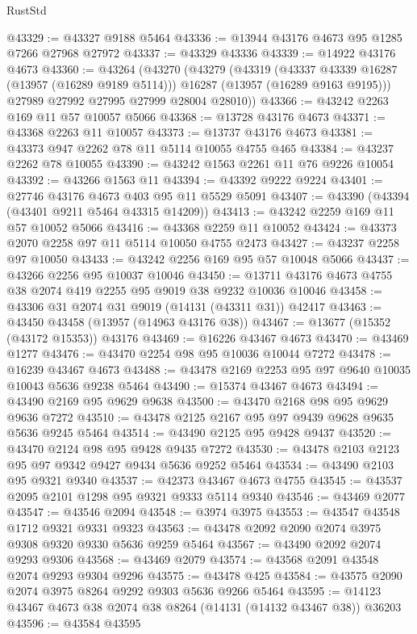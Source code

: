 \begin{lexlean}{RustStd}
\begin{coremodule}
@43329 := @43327 @9188 @5464
@43336 := @13944 @43176 @4673 @95 @1285 @7266 @27968 @27972
@43337 := @43329 @43336
@43339 := @14922 @43176 @4673
@43360 := @43264
    (@43270
      (@43279
        (@43319
          (@43337 @43339 @16287 (@13957 (@16289 @9189 @5114)))
          @16287
          (@13957 (@16289 @9163 @9195)))
        @27989
        @27992
        @27995
        @27999
        @28004
        @28010))
@43366 := @43242 @2263 @169 @11 @57 @10057 @5066
@43368 := @13728 @43176 @4673
@43371 := @43368 @2263 @11 @10057
@43373 := @13737 @43176 @4673
@43381 := @43373 @947 @2262 @78 @11 @5114 @10055 @4755 @465
@43384 := @43237 @2262 @78 @10055
@43390 := @43242 @1563 @2261 @11 @76 @9226 @10054
@43392 := @43266 @1563 @11
@43394 := @43392 @9222 @9224
@43401 := @27746 @43176 @4673 @403 @95 @11 @5529 @5091
@43407 := @43390 (@43394 (@43401 @9211 @5464 @43315 @14209))
@43413 := @43242 @2259 @169 @11 @57 @10052 @5066
@43416 := @43368 @2259 @11 @10052
@43424 := @43373 @2070 @2258 @97 @11 @5114 @10050 @4755 @2473
@43427 := @43237 @2258 @97 @10050
@43433 := @43242 @2256 @169 @95 @57 @10048 @5066
@43437 := @43266 @2256 @95 @10037 @10046
@43450 := @13711 @43176 @4673 @4755 @38 @2074 @419 @2255 @95 @9019 @38 @9232 @10036 @10046
@43458 := @43306 @31 @2074 @31 @9019 (@14131 (@43311 @31)) @42417
@43463 := @43450 @43458 (@13957 (@14963 @43176 @38))
@43467 := @13677 (@15352 (@43172 @15353)) @43176
@43469 := @16226 @43467 @4673
@43470 := @43469 @1277
@43476 := @43470 @2254 @98 @95 @10036 @10044 @7272
@43478 := @16239 @43467 @4673
@43488 := @43478 @2169 @2253 @95 @97 @9640 @10035 @10043 @5636 @9238 @5464
@43490 := @15374 @43467 @4673
@43494 := @43490 @2169 @95 @9629 @9638
@43500 := @43470 @2168 @98 @95 @9629 @9636 @7272
@43510 := @43478 @2125 @2167 @95 @97 @9439 @9628 @9635 @5636 @9245 @5464
@43514 := @43490 @2125 @95 @9428 @9437
@43520 := @43470 @2124 @98 @95 @9428 @9435 @7272
@43530 := @43478 @2103 @2123 @95 @97 @9342 @9427 @9434 @5636 @9252 @5464
@43534 := @43490 @2103 @95 @9321 @9340
@43537 := @42373 @43467 @4673 @4755
@43545 := @43537 @2095 @2101 @1298 @95 @9321 @9333 @5114 @9340
@43546 := @43469 @2077
@43547 := @43546 @2094
@43548 := @3974 @3975
@43553 := @43547 @43548 @1712 @9321 @9331 @9323
@43563 := @43478 @2092 @2090 @2074 @3975 @9308 @9320 @9330 @5636 @9259 @5464
@43567 := @43490 @2092 @2074 @9293 @9306
@43568 := @43469 @2079
@43574 := @43568 @2091 @43548 @2074 @9293 @9304 @9296
@43575 := @43478 @425
@43584 := @43575 @2090 @2074 @3975 @8264 @9292 @9303 @5636 @9266 @5464
@43595 := @14123 @43467 @4673 @38 @2074 @38 @8264 (@14131 (@14132 @43467 @38)) @36203
@43596 := @43584 @43595

\end{coremodule}
\end{lexlean}

